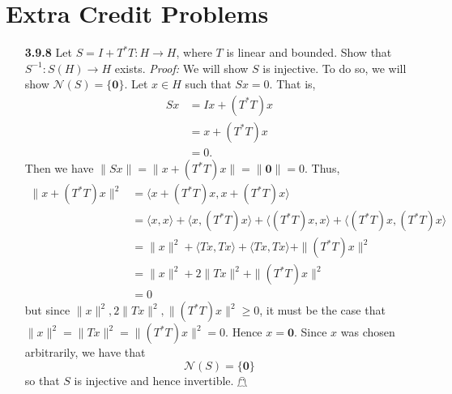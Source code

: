 \documentclass{article}
\begin{document}
\section*{Extra Credit Problems}
\begin{itemize}
    \item[\textbf{3.9.8}] Let $S = I + T^*T : H \to H$, where $T$ is linear and bounded. Show that $S^{-1}: S(H) \to H$ exists. 
    \newline\newline
    \textit{Proof:} We will show $S$ is injective. To do so, we will show $\mathcal{N}(S) = \{\mathbf{0}\}$. Let $x \in H$ such that $Sx = 0$. That is, 
    \begin{align*}
        Sx &= Ix + (T^*T)x\\
        &= x + (T^*T)x\\
        &= 0.
    \end{align*}
    Then we have $\|Sx\| = \|x + (T^*T)x\| = \|\mathbf{0}\| = 0$. Thus, 
    \begin{align*}
        \|x + (T^*T)x\|^2 &= \langle x + (T^*T)x, x + (T^*T)x\rangle\\
        &= \langle x ,x\rangle + \langle x, (T^*T)x\rangle + \langle (T^*T)x, x\rangle + \langle (T^*T)x, (T^*T)x\rangle\\
        &= \|x\|^2 + \langle Tx, Tx\rangle + \langle Tx, Tx\rangle + \|(T^*T)x\|^2 \tag{$\langle x, T^*y\rangle = \langle Tx, y\rangle$}\\
        &= \|x\|^2 + 2\|Tx\|^2 + \|(T^*T)x\|^2\\
        &= 0
    \end{align*}
    but since $\|x\|^2, 2\|Tx\|^2, \|(T^*T)x\|^2 \geq 0$, it must be the case that $\|x\|^2 = \|Tx\|^2 = \|(T^*T)x\|^2 = 0$. Hence $x = \mathbf{0}$. Since $x$ was chosen arbitrarily, we have that
    \[\mathcal{N}(S) = \{\mathbf{0}\}\]
    so that $S$ is injective and hence invertible. \hfill $\mathghost$


\end{itemize}
\end{document}
